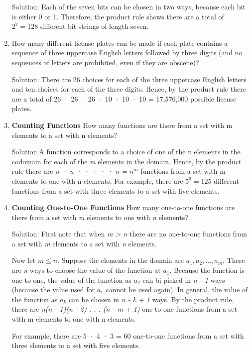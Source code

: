 \documentclass[11pt,a4paper]{book}
\begin{document}
\begin{enumerate}[label=Example~\arabic*]
Solution: Each of the seven bits can be chosen in two ways, because each bit is either 0 or 1.
Therefore, the product rule shows there are a total of $2^{7} = 128$ different bit strings of length seven.

\item How many different license plates can be made if each plate contains a sequence of three uppercase English letters followed by three digits (and no sequences of letters are prohibited, even if they are obscene)?

Solution: There are 26 choices for each of the three uppercase English letters and ten choices for each of the three digits. Hence, by the product rule there are a total of 26 · 26 · 26 · 10 · 10 · 10 = 17,576,000 possible license plates.

\item \textbf{Counting Functions} How many functions are there from a set with m elements to a set with
n elements?

Solution:A function corresponds to a choice of one of the n elements in the codomain for each of the \textit{m} elements in the domain.
Hence, by the product rule there are \textit{n · n · · · · · n = $n^{m}$} functions from a set with m elements to one with n elements. For example, there are $5^{3} = 125$ different functions from a set with three elements to a set with five elements.

\item \textbf{Counting One-to-One Functions} How many one-to-one functions are there from a set with
\textit{m} elements to one with \textit{n} elements?

Solution: First note that when \textit{m > n} there are no one-to-one functions from a set with \textit{m} elements to a set with \textit{n} elements.

Now let \textit{$m \leq n$}.
Suppose the elements in the domain are \textit{$a_1,a_2,...,a_m$}.
There are \textit{n} ways to choose the value of the function at \textit{$a_1$}.
Because the function is one-to-one, the value of the function as \textit{$a_2$} can bi picked in \textit{n - 1} ways (because the value used for \textit{$a_1$} cannot be used again).
In general, the value of the function as \textit{$a_k$} can be chosen in \emph{n - k + 1} ways.
By the product rule, there are \textit{n(n - 1)(n - 2) . . . (n - m + 1)} one-to-one functions from a set with m elements to one with n elements.

For example, there are 5 · 4 · 3 = 60 one-to-one functions from a set with three elements to a set with five elements.


\end{enumerate}
\end{document}
